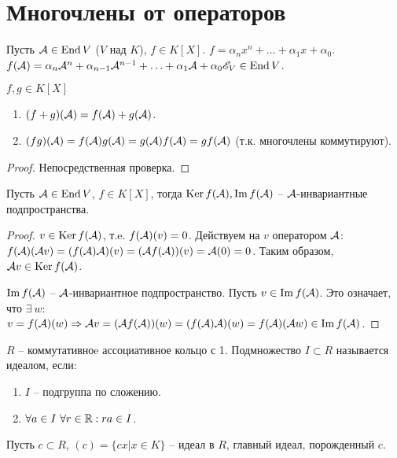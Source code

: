 \documentclass[main]{subfiles}
\begin{document}
\chapter{Многочлены от операторов}

Пусть $\mathcal{A} \in \operatorname{End} V$ ($V$ над $K$), $f \in K[X]$. $f = \alpha_n x^n + \ldots + \alpha_1 x + \alpha_0$.
$f(\mathcal{A}) = \alpha_n {\mathcal{A}}^n + \alpha_{n-1} {\mathcal{A}}^{n-1} + \ldots + \alpha_1 \mathcal{A} + \alpha_0 \mathscr{E}_V \in \operatorname{End} V$.

\begin{proposition}
    $f, g \in K[X]$
    \begin{enumerate}
        \item $(f+g)(\mathcal{A}) = f(\mathcal{A}) + g(\mathcal{A})$.
        \item $(fg)(\mathcal{A}) = f(\mathcal{A})g(\mathcal{A}) =g(\mathcal{A})f(\mathcal{A})=gf(\mathcal{A})$ (т.к. многочлены коммутируют).
    \end{enumerate}
\end{proposition}

\begin{proof}
    Непосредственная проверка.
\end{proof}

\begin{corollary}
    Пусть $\mathcal{A} \in \operatorname{End} V$, $f \in K[X]$, тогда $\operatorname{Ker} f(\mathcal{A}), \operatorname{Im} f(\mathcal{A})$ -- $\mathcal{A}$-инвариантные подпространства.
\end{corollary}

\begin{proof}
    $v \in \operatorname{Ker} f(\mathcal{A})$, т.e. $f(\mathcal{A}) (v) = 0$. Действуем на $v$ оператором $\mathcal{A}$: $f(\mathcal{A})(\mathcal{A} v) =
        (f(\mathcal{A})\mathcal{A})(v) = (\mathcal{A} f(\mathcal{A}))(v) = \mathcal{A}(0) = 0$.
    Таким образом, $\mathcal{A} v \in \operatorname{Ker} f(\mathcal{A})$.

    $\operatorname{Im} f(\mathcal{A})$ -- $\mathcal{A}$-инвариантное подпространство.
    Пусть $v \in \operatorname{Im} f(\mathcal{A})$. Это означает, что $\exists \ w$: $v = f(\mathcal{A})(w) \Rightarrow
        \mathcal{A} v = (\mathcal{A} f(\mathcal{A}))(w) = (f(\mathcal{A})\mathcal{A})(w) = f(\mathcal{A})(\mathcal{A} w) \in \operatorname{Im} f(\mathcal{A})$.
\end{proof}

$R$ -- коммутативноe ассоциативное кольцо с 1. Подмножество $I\subset R$ называется идеалом, если:
\begin{enumerate}
    \item $I$ -- подгруппа по сложению.
    \item $\forall a \in I \ \forall r \in \mathbb{R} : ra \in I$.
\end{enumerate}

Пусть $c \subset R$, $(c) = \{cx | x \in K\}$ -- идеал в $R$, главный идеал, порожденный $c$.
\end{document}
